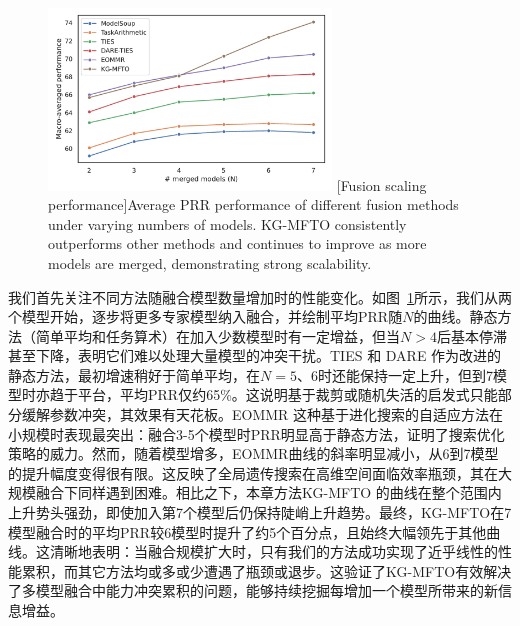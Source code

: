 \documentclass[../main.tex]{subfiles}
\begin{document}
\begin{figure}
	\centering
	\includegraphics[width=0.67\textwidth]{KG-MFTO/figure1_perf_scaling.pdf}
	[Fusion scaling performance]{Average PRR performance of different fusion methods under varying numbers of models. KG-MFTO consistently outperforms other methods and continues to improve as more models are merged, demonstrating strong scalability.}
	\label{fig:merge-performance-vs-num-models}
\end{figure}

我们首先关注不同方法随融合模型数量增加时的性能变化。如图~\ref{fig:merge-performance-vs-num-models}所示，我们从两个模型开始，逐步将更多专家模型纳入融合，并绘制平均PRR随$N$的曲线。静态方法（简单平均和任务算术）在加入少数模型时有一定增益，但当$N>4$后基本停滞甚至下降，表明它们难以处理大量模型的冲突干扰。TIES 和 DARE 作为改进的静态方法，最初增速稍好于简单平均，在$N=5$、6时还能保持一定上升，但到7模型时亦趋于平台，平均PRR仅约65\%。这说明基于裁剪或随机失活的启发式只能部分缓解参数冲突，其效果有天花板。EOMMR 这种基于进化搜索的自适应方法在小规模时表现最突出：融合3-5个模型时PRR明显高于静态方法，证明了搜索优化策略的威力。然而，随着模型增多，EOMMR曲线的斜率明显减小，从6到7模型的提升幅度变得很有限。这反映了全局遗传搜索在高维空间面临效率瓶颈，其在大规模融合下同样遇到困难。相比之下，本章方法KG-MFTO 的曲线在整个范围内上升势头强劲，即使加入第7个模型后仍保持陡峭上升趋势。最终，KG-MFTO在7模型融合时的平均PRR较6模型时提升了约5个百分点，且始终大幅领先于其他曲线。这清晰地表明：当融合规模扩大时，只有我们的方法成功实现了近乎线性的性能累积，而其它方法均或多或少遭遇了瓶颈或退步。这验证了KG-MFTO有效解决了多模型融合中能力冲突累积的问题，能够持续挖掘每增加一个模型所带来的新信息增益。
\end{document}
